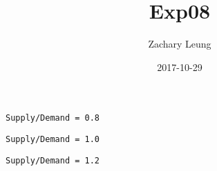 \documentclass[12pt]{article}
\title{Exp08}
\author{Zachary Leung}
\date{2017-10-29}
\begin{document}

\maketitle


\begin{verbatim}
Supply/Demand = 0.8
\end{verbatim}


\bigskip

\begin{verbatim}
Supply/Demand = 1.0
\end{verbatim}


\bigskip

\begin{verbatim}
Supply/Demand = 1.2
\end{verbatim}

\end{document}

